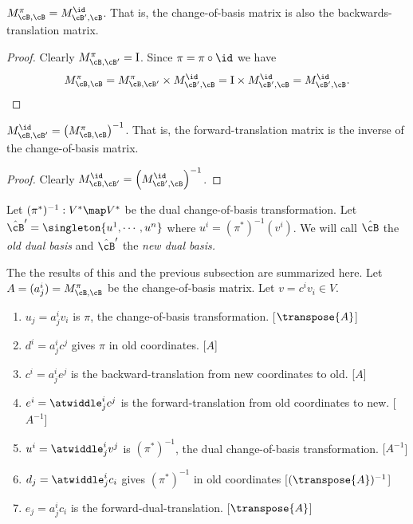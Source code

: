 \documentclass[oneside,12pt]{amsart}
\begin{document}
\begin{lemma}
$M^{\pi}_{\cB,\cB} = M^{\id}_{\cB^{\prime},\cB}$. That is, the change-of-basis
matrix is also the backwards-translation matrix.
\end{lemma}
\begin{proof}
Clearly $M^{\pi}_{\cB,\cB^{\prime}} = \mathrm{I}$.
Since $\pi = \pi \circ \id$ we have
$$M^{\pi}_{\cB,\cB} = M^{\pi}_{\cB,\cB^{\prime}} \times M^{\id}_{\cB^{\prime},\cB} 
= \mathrm{I} \times M^{\id}_{\cB^{\prime},\cB} =  M^{\id}_{\cB^{\prime},\cB}.$$
\end{proof}

\begin{corollary}
$M^{\id}_{\cB,\cB^{\prime}} = \left(M^{\pi}_{\cB,\cB}\right)^{-1}$. That is, the forward-translation matrix
is the inverse of the change-of-basis matrix.
\end{corollary}
\begin{proof}
Clearly $M^{\id}_{\cB,\cB^{\prime}} = \left(M^{\id}_{\cB^{\prime},\cB}\right)^{-1}$.
\end{proof}

Let $(\pi^*)^{-1}: V^* \map V^*$ be the dual change-of-basis transformation. 
Let $\hat{\cB}^{\prime} = \singleton{u^1,\cdots,u^n}$
where $u^i = (\pi^*)^{-1}(v^i)$. We will call $\hat{\cB}$ the \emph{old dual basis} and $\hat{\cB}^{\prime}$ the
\emph{new dual basis.}

\begin{remarks}
\label{main-remarks}
The the results of this and the previous subsection are summarized here.
Let $A = (a^i_j) = M^{\pi}_{\cB,\cB}$ be the change-of-basis matrix. Let $v = c^i v_i \in V$.
\begin{enumerate}
\item $u_j = a^i_j v_i$ is $\pi$, the change-of-basis transformation. [$\transpose{A}$]
\item $d^i = a^i_j c^j$ gives $\pi$ in old coordinates. [$A$]
\item $c^i = a^i_j e^j$ is the backward-translation from new coordinates to old. [$A$]
\item $e^i = \atwiddle^i_j c^j$ is the forward-translation from old coordinates to new. [$A^{-1}$]

\item $u^i = \atwiddle^i_j v^j$ is $(\pi^*)^{-1}$, the dual change-of-basis transformation. $[A^{-1}$]
\item $d_j = \atwiddle^i_j c_i$ gives $(\pi^*)^{-1}$ in old coordinates [$(\transpose{A})^{-1}$]
\item $e_j = a^i_j c_i$ is the forward-dual-translation. [$\transpose{A}$]
\end{enumerate}
\end{remarks}
\end{document}
